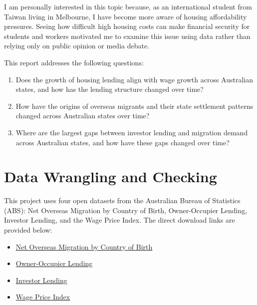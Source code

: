\documentclass[
  11pt,
  a4paper,
]{article}
\providecommand{\tightlist}{%
  \setlength{\itemsep}{0pt}\setlength{\parskip}{0pt}}
\begin{document}
I am personally interested in this topic because, as an international
student from Taiwan living in Melbourne, I have become more aware of
housing affordability pressures. Seeing how difficult high housing costs
can make financial security for students and workers motivated me to
examine this issue using data rather than relying only on public opinion
or media debate.

This report addresses the following questions:

\begin{enumerate}
\def\labelenumi{\arabic{enumi}.}
\tightlist
\item
  Does the growth of housing lending align with wage growth across
  Australian states, and how has the lending structure changed over
  time?
\item
  How have the origins of overseas migrants and their state settlement
  patterns changed across Australian states over time?
\item
  Where are the largest gaps between investor lending and migration
  demand across Australian states, and how have these gaps changed over
  time?
\end{enumerate}

\section{Data Wrangling and Checking}\label{data-wrangling-and-checking}

This project uses four open datasets from the Australian Bureau of
Statistics (ABS): Net Overseas Migration by Country of Birth,
Owner-Occupier Lending, Investor Lending, and the Wage Price Index. The
direct download links are provided below:

\begin{itemize}
\tightlist
\item
  \href{https://www.abs.gov.au/statistics/people/population/overseas-migration/latest-release/34070DO001_202425.xlsx}{Net
  Overseas Migration by Country of Birth}
\item
  \href{https://www.abs.gov.au/statistics/economy/finance/lending-indicators/latest-release/560104.xlsx}{Owner-Occupier
  Lending}
\item
  \href{https://www.abs.gov.au/statistics/economy/finance/lending-indicators/latest-release/560114.xlsx}{Investor
  Lending}
\item
  \href{https://www.abs.gov.au/statistics/economy/price-indexes-and-inflation/wage-price-index-australia/latest-release/634502b.xlsx}{Wage
  Price Index}
\end{itemize}
\end{document}
